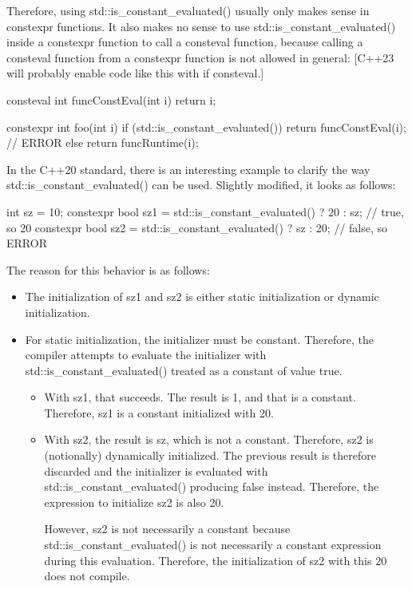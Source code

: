 Therefore, using std::is\_constant\_evaluated() usually only makes sense in constexpr functions. It also makes no sense to use std::is\_constant\_evaluated() inside a constexpr function to call a consteval function, because calling a consteval function from a constexpr function is not allowed in general: [C++23 will probably enable code like this with if consteval.]

\begin{cpp}
consteval int funcConstEval(int i) {
	return i;
}

constexpr int foo(int i) {
	if (std::is_constant_evaluated()) {
		return funcConstEval(i); // ERROR
	}
	else {
		return funcRuntime(i);
	}
}
\end{cpp}


In the C++20 standard, there is an interesting example to clarify the way std::is\_constant\_evaluated() can be used. Slightly modified, it looks as follows:

\begin{cpp}
int sz = 10;
constexpr bool sz1 = std::is_constant_evaluated() ? 20 : sz; // true, so 20
constexpr bool sz2 = std::is_constant_evaluated() ? sz : 20; // false, so ERROR
\end{cpp}

The reason for this behavior is as follows:

\begin{itemize}
\item 
The initialization of sz1 and sz2 is either static initialization or dynamic initialization.

\item 
For static initialization, the initializer must be constant. Therefore, the compiler attempts to evaluate the initializer with std::is\_constant\_evaluated() treated as a constant of value true.

\begin{itemize}
\item 
With sz1, that succeeds. The result is 1, and that is a constant. Therefore, sz1 is a constant initialized with 20.

\item
With sz2, the result is sz, which is not a constant. Therefore, sz2 is (notionally) dynamically initialized. The previous result is therefore discarded and the initializer is evaluated with std::is\_constant\_evaluated() producing false instead. Therefore, the expression to initialize sz2 is also 20.

However, sz2 is not necessarily a constant because std::is\_constant\_evaluated() is not necessarily a constant expression during this evaluation. Therefore, the initialization of sz2 with this 20 does not compile.
\end{itemize}
\end{itemize}

